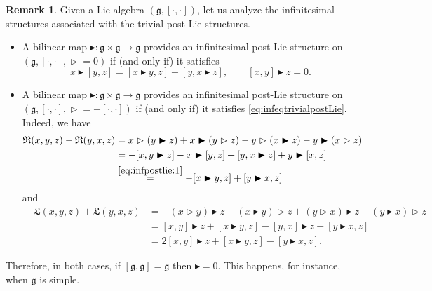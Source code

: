 \documentclass[10pt]{article}
\theoremstyle{definition}
\newtheorem{remark}[lemma]{Remark}
\newcommand{\g}{\mathfrak{g}}
\newcommand{\wt}{\vartriangleright}
\newcommand{\bt}{\blacktriangleright}
\newcommand{\R}{\mathfrak{R}}
\renewcommand{\L}{\mathfrak{L}}
\begin{document}
\begin{remark}\label{rmk:infinitesimalfortrivialpostLie}
Given a Lie algebra $(\g,[\cdot,\cdot])$, let us analyze the infinitesimal structures associated with the trivial post-Lie structures.
\begin{itemize}
    \item[1)] A bilinear map $\bt:\g\times\g\to\g$ provides an infinitesimal post-Lie structure on $(\g,[\cdot,\cdot],\wt=0)$ if (and only if) it satisfies
\begin{equation}\label{eq:infeqtrivialpostLie}
x \bt [y,z] = [x \bt y,z] + [y,x \bt z],\qquad [x,y]\bt z=0. 
\end{equation}
\item[2)] A bilinear map $\bt:\g\times\g\to\g$ provides an infinitesimal post-Lie structure on $(\g,[\cdot,\cdot],\wt=-[\cdot,\cdot])$ if (and only if) it satisfies \eqref{eq:infeqtrivialpostLie}.
Indeed, we have
\begin{align*}
    \R(x,y,z) - \R(y,x,z)&=x \wt (y \bt z) + x \bt (y \wt z)-y \wt (x \bt z)- y \bt (x \wt z)\\&=-[x,y\bt z]-x\bt[y,z]+[y,x\bt z]+y\bt[x,z]\\&\overset{\eqref{eq:infpostlie:1}}{=}-[x\bt y,z]+[y\bt x,z]
\end{align*}
and
\begin{align*}
    - \L(x,y,z) + \L(y,x,z)&=-(x \wt y) \bt z - (x \bt y) \wt z+(y \wt x) \bt z + (y \bt x) \wt z\\&=[x,y] \bt z +[x \bt y,z]-[y,x] \bt z -[y \bt x,z]\\&=2[x,y] \bt z +[x \bt y,z] -[y \bt x,z].
\end{align*}
\end{itemize}
Therefore, in both cases, if $[\g,\g]=\g$ then $\bt=0$. This happens, for instance, when $\g$ is simple.
\end{remark}
\end{document}
